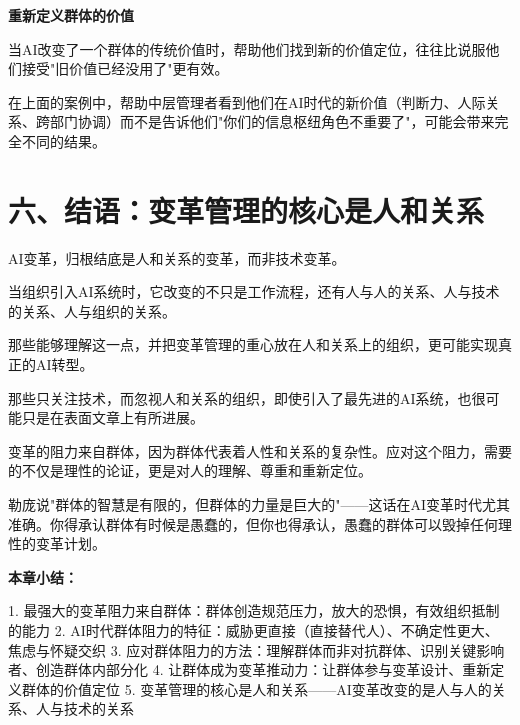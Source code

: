 \textbf{重新定义群体的价值}

当AI改变了一个群体的传统价值时，帮助他们找到新的价值定位，往往比说服他们接受"旧价值已经没用了"更有效。

在上面的案例中，帮助中层管理者看到他们在AI时代的新价值（判断力、人际关系、跨部门协调）而不是告诉他们"你们的信息枢纽角色不重要了"，可能会带来完全不同的结果。

\section{六、结语：变革管理的核心是人和关系}


AI变革，归根结底是人和关系的变革，而非技术变革。

当组织引入AI系统时，它改变的不只是工作流程，还有人与人的关系、人与技术的关系、人与组织的关系。

那些能够理解这一点，并把变革管理的重心放在人和关系上的组织，更可能实现真正的AI转型。

那些只关注技术，而忽视人和关系的组织，即使引入了最先进的AI系统，也很可能只是在表面文章上有所进展。

变革的阻力来自群体，因为群体代表着人性和关系的复杂性。应对这个阻力，需要的不仅是理性的论证，更是对人的理解、尊重和重新定位。

勒庞说"群体的智慧是有限的，但群体的力量是巨大的"——这话在AI变革时代尤其准确。你得承认群体有时候是愚蠢的，但你也得承认，愚蠢的群体可以毁掉任何理性的变革计划。


\textbf{本章小结：}

1. 最强大的变革阻力来自群体：群体创造规范压力，放大的恐惧，有效组织抵制的能力
2. AI时代群体阻力的特征：威胁更直接（直接替代人）、不确定性更大、焦虑与怀疑交织
3. 应对群体阻力的方法：理解群体而非对抗群体、识别关键影响者、创造群体内部分化
4. 让群体成为变革推动力：让群体参与变革设计、重新定义群体的价值定位
5. 变革管理的核心是人和关系——AI变革改变的是人与人的关系、人与技术的关系
